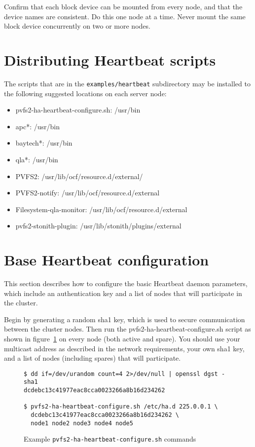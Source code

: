 \documentclass[11pt]{article}
\begin{document}
Confirm that each block device can be mounted from every node, and that
the device names are consistent.  Do this one node at a time.  Never mount
the same block device concurrently on two or more nodes.

\section{Distributing Heartbeat scripts}

The scripts that are in the \texttt{examples/heartbeat} subdirectory may be
installed to the following suggested locations on each server node:
\begin{itemize}
\item pvfs2-ha-heartbeat-configure.sh: /usr/bin
\item apc*: /usr/bin
\item baytech*: /usr/bin
\item qla*: /usr/bin
\item PVFS2: /usr/lib/ocf/resource.d/external/
\item PVFS2-notify: /usr/lib/ocf/resource.d/external
\item Filesystem-qla-monitor: /usr/lib/ocf/resource.d/external
\item pvfs2-stonith-plugin: /usr/lib/stonith/plugins/external
\end{itemize}

\section{Base Heartbeat configuration}

This section describes how to configure the basic Heartbeat daemon
parameters, which include an authentication key and a list of nodes that
will participate in the cluster.

Begin by generating a random sha1 key, which is used to secure
communication between the cluster nodes.  Then run the 
pvfs2-ha-heartbeat-configure.sh script as shown in
figure~\ref{fig:haconf} on every node (both active and spare).  You
should use your multicast address as described in the network
requirements, your own sha1 key, and a list of
nodes (including spares) that will participate.


\begin{figure}
\begin{scriptsize}
\begin{verbatim}
$ dd if=/dev/urandom count=4 2>/dev/null | openssl dgst -sha1
dcdebc13c41977eac8cca0023266a8b16d234262

$ pvfs2-ha-heartbeat-configure.sh /etc/ha.d 225.0.0.1 \
  dcdebc13c41977eac8cca0023266a8b16d234262 \
  node1 node2 node3 node4 node5
\end{verbatim}
\end{scriptsize}
\caption{Example \texttt{pvfs2-ha-heartbeat-configure.sh} commands}
\label{fig:haconf}
\end{figure}
\end{document}
